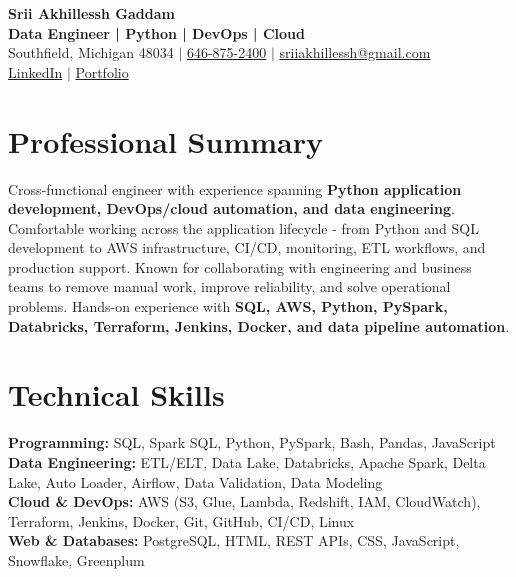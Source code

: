 \documentclass[letterpaper,10pt]{article}
\begin{document}
\fontsize{9.35pt}{10.45pt}\selectfont

\begin{center}
    {\LARGE \textbf{Srii Akhillessh Gaddam}} \\[-1pt]
    \textbf{Data Engineer | Python | DevOps | Cloud} \\[2pt]
    Southfield, Michigan 48034 $|$
    \href{tel:6468752400}{646-875-2400} $|$
    \href{mailto:sriiakhillessh@gmail.com}{sriiakhillessh@gmail.com} \\[1pt]
    \href{https://www.linkedin.com/in/srii-akhiilessh-gaddam-b48668191/}{LinkedIn} $|$
    \href{https://sriiakhillesshg.github.io/portfolio/}{Portfolio}
\end{center}
\vspace{-8pt}

\section{Professional Summary}
\small{Cross-functional engineer with experience spanning \textbf{Python application development, DevOps/cloud automation, and data engineering}. Comfortable working across the application lifecycle - from Python and SQL development to AWS infrastructure, CI/CD, monitoring, ETL workflows, and production support. Known for collaborating with engineering and business teams to remove manual work, improve reliability, and solve operational problems. Hands-on experience with \textbf{SQL, AWS, Python, PySpark, Databricks, Terraform, Jenkins, Docker, and data pipeline automation}.}

\section{Technical Skills}
\small{
\textbf{Programming:} SQL, Spark SQL, Python, PySpark, Bash, Pandas, JavaScript \\
\textbf{Data Engineering:} ETL/ELT, Data Lake, Databricks, Apache Spark, Delta Lake, Auto Loader, Airflow, Data Validation, Data Modeling \\
\textbf{Cloud \& DevOps:} AWS (S3, Glue, Lambda, Redshift, IAM, CloudWatch), Terraform, Jenkins, Docker, Git, GitHub, CI/CD, Linux \\
\textbf{Web \& Databases:} PostgreSQL, HTML, REST APIs, CSS, JavaScript, Snowflake, Greenplum
}
\end{document}
